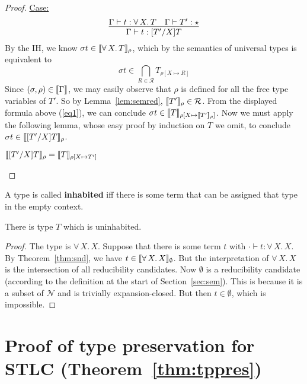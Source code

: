 \documentclass{article}
\begin{document}
\begin{proof}
\underline{Case:}
\[
\infer{\Gamma \vdash t : [T'/X]T}{\Gamma \vdash t : \forall\, X.\,T & \Gamma \vdash T' : \star} 
\]
By the IH, we know $\sigma t\in\llbracket \forall\, X.\,T \rrbracket_\rho$, which by the semantics
of universal types is equivalent to
\begin{equation}
\label{eq1}
\sigma t \in \bigcap_{R\in\mathcal{R}} T_{\rho[X\mapsto R]}
\end{equation}
Since $(\sigma,\rho)\in\llbracket \Gamma \rrbracket$, we may easily observe that
$\rho$ is defined for all the free type variables of $T'$.  So by
Lemma~\ref{lem:semred}, $\llbracket T' \rrbracket_\rho\in\mathcal{R}$.  From the
displayed formula above (\ref{eq1}), we can conclude $\sigma t\in
\llbracket T \rrbracket_{\rho[X\mapsto \llbracket T' \rrbracket_\rho]}$.  Now we must apply the
following lemma, whose easy proof by induction on $T$ we omit, to
conclude $\sigma t\in\llbracket [T'/X]T \rrbracket_\rho$.
\begin{lemma}
$\llbracket [T'/X]T \rrbracket_\rho = \llbracket T \rrbracket_{\rho[X\mapsto T']}$
\end{lemma}

\end{proof}

A type is called \textbf{inhabited} iff there is some term that can be assigned
that type in the empty context.  

\vspace{0.25cm}
\begin{corollary}
  There is type $T$ which is uninhabited.
\end{corollary}
\begin{proof}
  The type is $\forall\,X.\,X$.  Suppose that there is some term $t$ with
  $\cdot\vdash t : \forall\,X.\,X$.  By Theorem~\ref{thm:snd}, we have $t \in \llbracket \forall\,X.\,X \rrbracket_\emptyset$.
  But the interpretation of $\forall\,X.\,X$ is the intersection of all reducibility candidates.
  Now $\emptyset$ is a reducibility candidate (according to the definition at the start of Section~\ref{sec:sem}).
  This is because it is a subset of $\mathcal{N}$ and is trivially expansion-closed.  But then $t\in\emptyset$,
  which is impossible.
  \end{proof}
  



\appendix

\section{Proof of type preservation for STLC (Theorem~\ref{thm:tppres})}
\label{sec:tppres}
\end{document}
